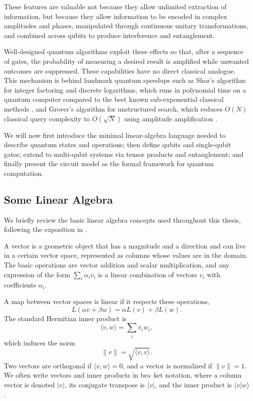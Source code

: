 \documentclass[12pt,a4paper,openany]{report}
\let\parencite\citep
\let\textcite\citet
\begin{document}
These features are valuable not because they allow unlimited extraction of information, but because they allow information to be encoded in complex amplitudes and phases, manipulated through continuous unitary transformations, and combined across qubits to produce interference and entanglement. 

Well-designed quantum algorithms exploit these effects so that, after a sequence of gates, the probability of measuring a desired result is amplified while unwanted outcomes are suppressed. These capabilities have no direct classical analogue. This mechanism is behind landmark quantum speedups such as Shor's algorithm for integer factoring and discrete logarithms, which runs in polynomial time on a quantum computer compared to the best known sub-exponential classical methods \parencite{shor_1994_focs,shor_1997_siam}, and Grover's algorithm for unstructured search, which reduces $O(N)$ classical query complexity to $O(\sqrt{N})$ using amplitude amplification \parencite{grover_1996_search}.

We will now first introduce the minimal linear-algebra language needed to describe quantum states and operations; then define qubits and single-qubit gates; extend to multi-qubit systems via tensor products and entanglement; and finally present the circuit model as the formal framework for quantum computation.

\subsection{Some Linear Algebra}

We briefly review the basic linear algebra concepts used throughout this thesis, following the exposition in \textcite[Chapter~2]{nielsen_chuang_qcqi}.

A vector is a geometric object that has a magnitude and a direction and can live in a certain vector space, represented as columns whose values are in the domain. The basic operations are vector addition and scalar multiplication, and any expression of the form $\sum_i \alpha_i v_i$ is a linear combination of vectors $v_i$ with coefficients $\alpha_i$.

A map between vector spaces is linear if it respects these operations,
\[
L(\alpha v + \beta w) = \alpha L(v) + \beta L(w).
\]
The standard Hermitian inner product is
\[
\langle v,w\rangle = \sum_i \overline{v_i} w_i,
\]
which induces the norm
\[
\|v\| = \sqrt{\langle v,v\rangle}.
\]
Two vectors are orthogonal if $\langle v,w\rangle = 0$, and a vector is normalized if $\|v\| = 1$. We often write vectors and inner products in bra--ket notation, where a column vector is denoted $\lvert v\rangle$, its conjugate transpose is $\langle v\rvert$, and the inner product is $\langle v \vert w\rangle$.
\end{document}
